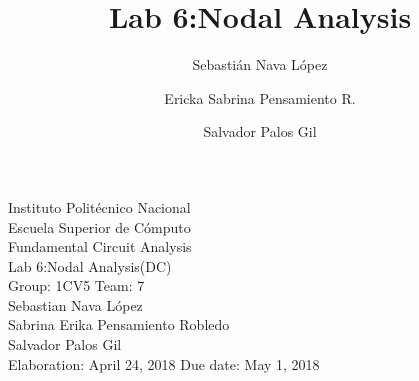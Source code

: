 \documentclass[letterpaper]{article}
\title{Lab 6:Nodal Analysis}
\author{
    Sebastián Nava López\\
    \and
    Ericka Sabrina Pensamiento R.\\
    \and
    Salvador Palos Gil
}
\begin{document}
\begin{titlepage}
    \centering
    {\Huge Instituto Politécnico Nacional}\\[3ex]
    {\huge Escuela Superior de Cómputo}\\[8ex]
    {\huge Fundamental Circuit Analysis}\\[12ex]
    {\Large Lab 6:Nodal Analysis(DC)}\\[20ex]
    {\Large Group: 1CV5 Team: 7 \\[8ex]
    Sebastian Nava López\\[4ex]
    Sabrina Erika Pensamiento Robledo\\[4ex]
    Salvador Palos Gil\\[18ex]
    }
    \large{Elaboration: April 24, 2018 \hspace{8em} Due date: May 1, 2018}
\end{titlepage}
\tableofcontents
\newpage
\end{document}
